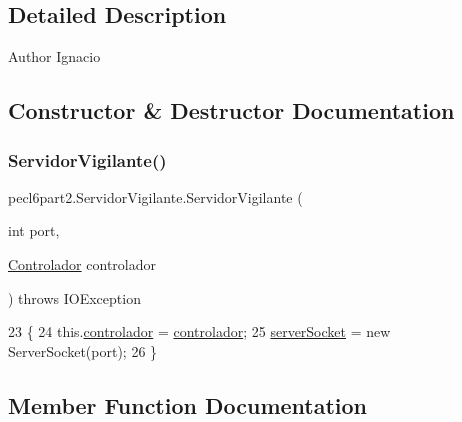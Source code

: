 \subsection{Detailed Description}
\begin{DoxyAuthor}{Author}
Ignacio 
\end{DoxyAuthor}


\subsection{Constructor \& Destructor Documentation}
\mbox{\label{classpecl6part2_1_1_servidor_vigilante_aec607bf37f7f8fe1c8ff1e6c36d5c3ca}} 
\subsubsection{\texorpdfstring{Servidor\+Vigilante()}{ServidorVigilante()}}
{\footnotesize\ttfamily pecl6part2.\+Servidor\+Vigilante.\+Servidor\+Vigilante (\begin{DoxyParamCaption}\item[{int}]{port,  }\item[{\mbox{\hyperlink{classpecl6part2_1_1_controlador}{Controlador}}}]{controlador }\end{DoxyParamCaption}) throws I\+O\+Exception\hspace{0.3cm}{\ttfamily [inline]}}


\begin{DoxyCode}
23                                                                                    \{
24         this.\mbox{\hyperlink{classpecl6part2_1_1_servidor_vigilante_a74b80f98c6625e80f95d1d1bfd0c49cc}{controlador}} = \mbox{\hyperlink{classpecl6part2_1_1_servidor_vigilante_a74b80f98c6625e80f95d1d1bfd0c49cc}{controlador}};
25       \mbox{\hyperlink{classpecl6part2_1_1_servidor_vigilante_aaa40cd2b5cc8c603c6dce1d8a440aca6}{serverSocket}} = \textcolor{keyword}{new} ServerSocket(port);
26     \}
\end{DoxyCode}


\subsection{Member Function Documentation}
\mbox{\label{classpecl6part2_1_1_servidor_vigilante_a5bb0ef0a09a59f8d1589fa851085f190}} 

